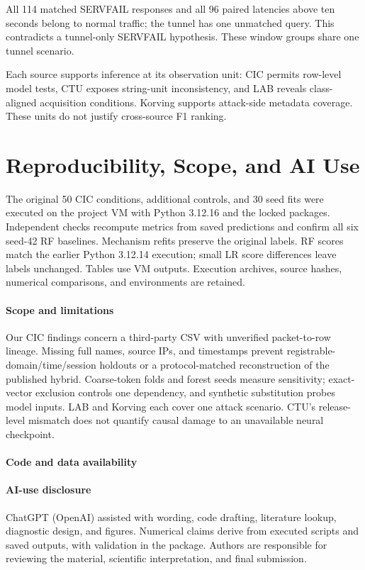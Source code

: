 \documentclass[conference]{IEEEtran}
\begin{document}
All 114 matched SERVFAIL responses and all 96 paired latencies above ten seconds belong to normal traffic; the tunnel has one unmatched query. This contradicts a tunnel-only SERVFAIL hypothesis. These window groups share one tunnel scenario.

Each source supports inference at its observation unit: CIC permits row-level model tests, CTU exposes string-unit inconsistency, and LAB reveals class-aligned acquisition conditions. Korving supports attack-side metadata coverage. These units do not justify cross-source F1 ranking.

\section{Reproducibility, Scope, and AI Use}
The original 50 CIC conditions, additional controls, and 30 seed fits were executed on the project VM with Python 3.12.16 and the locked packages. Independent checks recompute metrics from saved predictions and confirm all six seed-42 RF baselines. Mechanism refits preserve the original labels. RF scores match the earlier Python 3.12.14 execution; small LR score differences leave labels unchanged. Tables use VM outputs. Execution archives, source hashes, numerical comparisons, and environments are retained.

\paragraph{Scope and limitations}
Our CIC findings concern a third-party CSV with unverified packet-to-row lineage. Missing full names, source IPs, and timestamps prevent registrable-domain/time/session holdouts or a protocol-matched reconstruction of the published hybrid. Coarse-token folds and forest seeds measure sensitivity; exact-vector exclusion controls one dependency, and synthetic substitution probes model inputs. LAB and Korving each cover one attack scenario. CTU's release-level mismatch does not quantify causal damage to an unavailable neural checkpoint.

\paragraph{Code and data availability}


\paragraph{AI-use disclosure}
ChatGPT (OpenAI) assisted with wording, code drafting, literature lookup, diagnostic design, and figures. Numerical claims derive from executed scripts and saved outputs, with validation in the package. Authors are responsible for reviewing the material, scientific interpretation, and final submission.
\end{document}
